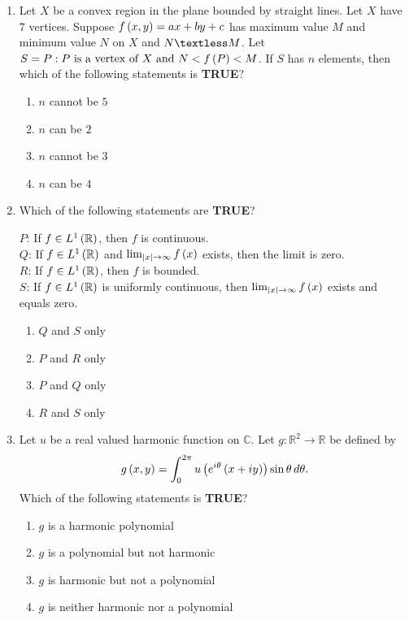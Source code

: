 \documentclass[journal,12pt,twocolumn]{IEEEtran}
\theoremstyle{remark}
\begin{document}
\begin{enumerate}[start=40]
    \item Let $X$ be a convex region in the plane bounded by straight lines. Let $X$ have $7$ vertices. Suppose $f \left(x, y\right) = ax + by + c$ has maximum value $M$ and minimum value $N$ on $X$ and $N \textless M$. Let $S = {P: P \text{ is a vertex of } X \text{ and } N < f \left(P\right) < M}$. If $S$ has $n$ elements, then which of the following statements is \textbf{TRUE}?
    \begin{enumerate}
        \item $n$ cannot be $5$
        \item $n$ can be $2$
        \item $n$ cannot be $3$
        \item $n$ can be $4$
    \end{enumerate}

    \item Which of the following statements are \textbf{TRUE}?
    
    $P$: If $f \in L^1 \left(\mathbb{R}\right)$, then $f$ is continuous. \\
    $Q$: If $f \in L^1 \left(\mathbb{R}\right)$ and $\lim_{\left\vert x\right\vert \to \infty} f \left(x\right)$ exists, then the limit is zero. \\
    $R$: If $f \in L^1 \left(\mathbb{R}\right)$, then $f$ is bounded. \\
    $S$: If $f \in L^{1} \left(\mathbb{R}\right)$ is uniformly continuous, then $\lim_{\left\vert x\right\vert \to \infty} f \left(x\right)$ exists and equals zero.
    
    \begin{enumerate}
        \item $Q$ and $S$ only
        \item $P$ and $R$ only
        \item $P$ and $Q$ only
        \item $R$ and $S$ only
    \end{enumerate}

    \item Let $u$ be a real valued harmonic function on $\mathbb{C}$. Let $g: \mathbb{R}^{2} \rightarrow \mathbb{R}$ be defined by
    \[
    g \left(x, y\right) = \int_{0}^{2 \pi} u \left(e^{i \theta} \left(x + iy\right)\right) \sin \theta \, d \theta.
    \]
    Which of the following statements is \textbf{TRUE}?
    \begin{enumerate}
        \item $g$ is a harmonic polynomial
        \item $g$ is a polynomial but not harmonic
        \item $g$ is harmonic but not a polynomial
        \item $g$ is neither harmonic nor a polynomial
    \end{enumerate}


\end{enumerate}
\end{document}
